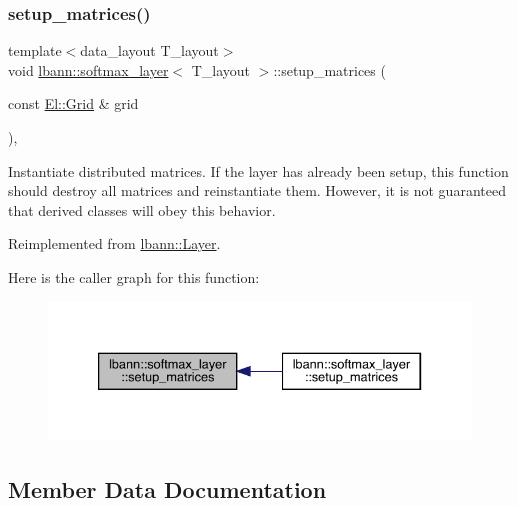 \subsubsection{\texorpdfstring{setup\+\_\+matrices()}{setup\_matrices()}\hspace{0.1cm}{\footnotesize\ttfamily [3/3]}}
{\footnotesize\ttfamily template$<$data\+\_\+layout T\+\_\+layout$>$ \\
void \hyperlink{classlbann_1_1softmax__layer}{lbann\+::softmax\+\_\+layer}$<$ T\+\_\+layout $>$\+::setup\+\_\+matrices (\begin{DoxyParamCaption}\item[{const \hyperlink{base_8hpp_a9951bb1719d534e0401b1f06cad19eab}{El\+::\+Grid} \&}]{grid }\end{DoxyParamCaption})\hspace{0.3cm}{\ttfamily [override]}, {\ttfamily [virtual]}}

Instantiate distributed matrices. If the layer has already been setup, this function should destroy all matrices and reinstantiate them. However, it is not guaranteed that derived classes will obey this behavior. 

Reimplemented from \hyperlink{classlbann_1_1Layer_a57bbe21131dc00ab5cf9ea5e3656808e}{lbann\+::\+Layer}.

Here is the caller graph for this function\+:\nopagebreak
\begin{figure}[H]
\begin{center}
\leavevmode
\includegraphics[width=333pt]{classlbann_1_1softmax__layer_af07463a1d99832d3bf11610311fd7da4_icgraph}
\end{center}
\end{figure}


\subsection{Member Data Documentation}
\mbox{\label{classlbann_1_1softmax__layer_ab3bf2d92f4441923dd0b792c38ec774a}} 
